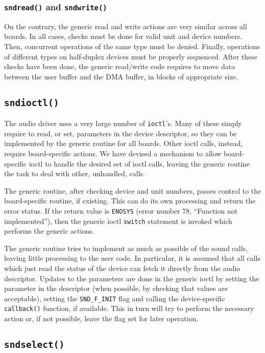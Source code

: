 \documentclass[11pt]{article}
\begin{document}
\subsubsection{{\tt sndread()} and {\tt sndwrite()} }

On the contrary, the generic read and write actions are very similar
across all boards. In all cases, checks must be done for valid unit
and device numbers. Then, concurrent operations of the same type
must be denied. Finally, operations of different types on half-duplex
devices must be properly sequenced. After these checks have been
done, the generic read/write code requires to move data between the
user buffer and the DMA buffer, in blocks of appropriate size.

\subsection{{\tt sndioctl()}}

The audio driver uses a very large number of {\tt ioctl}'s. Many
of these simply require to read, or set, parameters in the device
descriptor, so they can be implemented by the generic routine for
all boards.  Other ioctl calls, instead, require board-specific
actions.  We have devised a mechanism to allow board-specific ioctl
to handle the desired set of ioctl calls, leaving the generic
routine the task to deal with other, unhandled, calls.

The generic routine, after checking device and unit numbers, passes
control to the board-specific routine, if existing. This can do its
own processing and return the error status. If the return value is
{\tt ENOSYS} (error number 78, ``Function not implemented''), then
the generic ioctl {\tt switch} statement is invoked which performs
the generic actions.

The generic routine tries to implement as much as possible of the
sound calls, leaving little processing to the user code. In
particular, it is assumed that all calls which just read the status
of the device can fetch it directly from the audio descriptor.
Updates to the parameters are done in the generic ioctl by setting
the parameter in the descriptor (when possible, by checking that
values are acceptable), setting the {\tt SND\_F\_INIT} flag and
calling the device-specific {\tt callback()} function, if available.
This in turn will try to perform the necessary action or, if not
possible, leave the flag set for later operation.


\subsection{{\tt sndselect()}}
\end{document}
